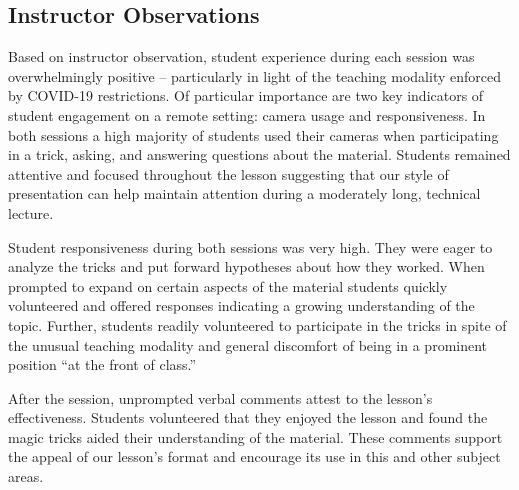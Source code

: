 \subsection{Instructor Observations}

Based on instructor observation, student experience during
each session was overwhelmingly positive --
particularly in light of the teaching modality enforced by COVID-19
restrictions.
Of particular importance are two key indicators
of student engagement on a remote setting: camera usage and
responsiveness.  In both sessions a high majority of students used their
cameras when participating in a trick, asking, and answering questions
about the material.  Students remained attentive and focused throughout
 the lesson suggesting that our
style of presentation can help maintain attention during a moderately long,
technical lecture.

Student responsiveness during both sessions was very high.
They were eager to analyze the
tricks and put forward hypotheses about how they worked.
When prompted to
expand on certain aspects of the material students quickly volunteered and
offered responses indicating a growing understanding of the topic.
Further, students readily volunteered to participate in the tricks in spite
of the unusual teaching modality and general discomfort of being in a
prominent position ``at the front of class.''

After the session,
unprompted verbal comments attest to the lesson's effectiveness.
Students volunteered that they enjoyed the
lesson and found the magic tricks aided their understanding of the
material.  These comments support the appeal of our lesson's format and
encourage its use in this and other subject areas.
